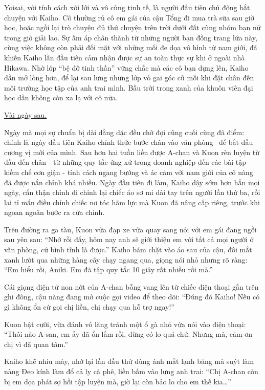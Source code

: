 \documentclass[../main.tex]{subfiles}
\begin{document}
Yoisai, với tính cách xởi lởi và vô cùng tinh tế, là người đầu tiên chủ động bắt chuyện với Kaiho. Cô thường rủ cô em gái của cậu Tổng đi mua trà sữa sau giờ học, hoặc ngồi lại trò chuyện đủ thứ chuyện trên trời dưới đất cùng nhóm bạn nữ trong giờ giải lao. Sự ấm áp chân thành từ những người bạn đồng trang lứa này, cùng việc không còn phải đối mặt với những mối đe dọa vô hình từ nam giới, đã khiến Kaiho lần đầu tiên cảm nhận được sự an toàn thực sự khi ở ngoài nhà Hikawa. Nhờ lớp ``bệ đỡ tinh thần'' vững chắc mà các cô bạn dựng lên, Kaiho dần mở lòng hơn, để lại sau lưng những lớp vỏ gai góc cũ mỗi khi đặt chân đến môi trường học tập của anh trai mình. Bầu trời trong xanh của khuôn viên đại học dần không còn xa lạ với cô nữa.

\begin{center}
  \uline{Vài ngày sau.}
\end{center}

Ngày mà mọi sự chuẩn bị dài dằng dặc đều chờ đợi cũng cuối cùng đã điểm: chính là ngày đầu tiên Kaiho chính thức bước chân vào văn phòng \hls\ để bắt đầu cương vị mới của mình. Sau hơn hai tuần liền được A-chan và Kuon rèn luyện từ đầu đến chân - từ những quy tắc ứng xử trong doanh nghiệp đến các bài tập kiềm chế cơn giận - tính cách ngang bướng và ác cảm với nam giới của cô nàng đã được nắn chỉnh khá nhiều. Ngày đầu tiên đi làm, Kaiho dậy sớm hơn hẳn mọi ngày, cẩn thận chỉnh đi chỉnh lại chiếc áo sơ mi dài tay trên người lần thứ ba, rồi lại tỉ mẩn điều chỉnh chiếc nơ tóc hãm lực mà Kuon đã nâng cấp riêng, trước khi ngoan ngoãn bước ra cửa chính.

Trên đường ra ga tàu, Kuon vừa đạp xe vừa quay sang nói với em gái đang ngồi sau yên sau: ``Nhớ rồi đấy, hôm nay anh sẽ giới thiệu em với tất cả mọi người ở văn phòng, cứ bình tĩnh là được.'' Kaiho bám chặt vào áo sau của cậu, đôi mắt xanh lướt qua những hàng cây chạy ngang qua, giọng nói nhỏ nhưng rõ ràng: ``Em hiểu rồi, Aniki. Em đã tập quy tắc 10 giây rất nhiều rồi mà.''

Cái giọng điện tử non nớt của A-chan bỗng vang lên từ chiếc điện thoại gắn trên ghi đông, cậu nàng đang mở cuộc gọi video để theo dõi: ``Đúng đó Kaiho! Nếu có gì không ổn cứ gọi chị liền, chị chạy qua hỗ trợ ngay!''

Kuon bật cười, vừa đánh vô lăng tránh một ổ gà nhỏ vừa nói vào điện thoại: ``Thôi nào A-san, em ấy đã ổn lắm rồi, đừng có lo quá chứ. Nhưng mà, cảm ơn chị vì đã quan tâm.''

Kaiho khẽ nhíu mày, nhớ lại lần đầu thử dùng ánh mắt lạnh băng mà suýt làm nàng Đeo kính làm đổ cả ly cà phê, liền bấm vào lưng anh trai: ``Chị A-chan còn bị em dọa phát sợ hồi tập luyện mà, giờ lại còn bảo lo cho em thế kia\dots''
\end{document}
